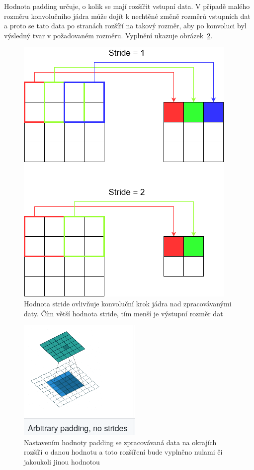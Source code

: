 Hodnota padding určuje, o kolik se mají rozšířit vstupní data. V případě malého rozměru konvolučního jádra může dojít k nechtěné změně rozměrů vstupních dat a proto se tato data po stranách rozšíří na takový rozměr, aby po konvoluci byl výsledný tvar v požadovaném rozměru. Vyplnění ukazuje obrázek~\ref{fig:conv_padding}.


\begin{figure}[H]
    \centering
    \includegraphics[scale=0.5]{obrazky-figures/stride.png}
    \caption{\label{fig:conv_stride}Hodnota stride ovlivňuje konvoluční krok jádra nad zpracovávanými daty. Čím větší hodnota stride, tím menší je výstupní rozměr dat}
\end{figure}

\begin{figure}[H]
    \centering
    \includegraphics[scale=0.7]{obrazky-figures/padding.png}
    \caption{\label{fig:conv_padding}Nastavením hodnoty padding se zpracovávaná data na okrajích rozšíří o danou hodnotu a toto rozšíření bude vyplněno nulami či jakoukoli jinou hodnotou}
\end{figure}



